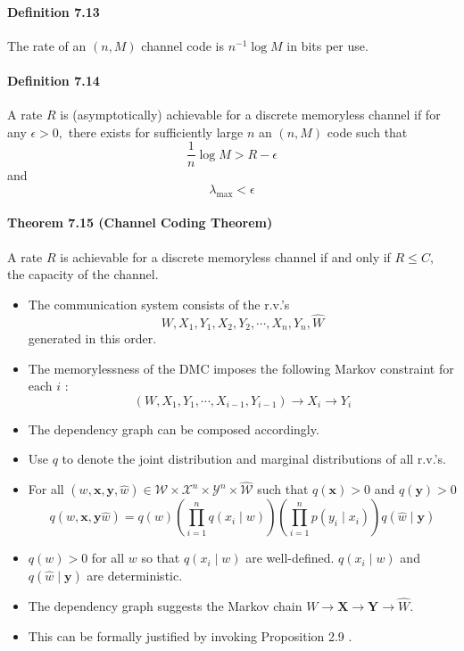 \documentclass[8pt]{article}
\begin{document}
\paragraph{Definition 7.13} The rate of an $(n, M)$ channel code is $n^{-1} \log M$ in bits per
use.

\paragraph{Definition 7.14} A rate $R$ is (asymptotically) achievable for a discrete memoryless channel if for any $\epsilon>0,$ there exists for sufficiently large $n$ an $(n, M)$ code such that
$$
\frac{1}{n} \log M>R-\epsilon
$$
and
$$
\lambda_{\max }<\epsilon
$$
\paragraph{Theorem 7.15 (Channel Coding Theorem)} A rate $R$ is achievable for a discrete memoryless channel if and only if $R \leq C,$ the capacity of the channel.

\begin{itemize}
	\item The communication system consists of the r.v.'s
	$$
	W, X_{1}, Y_{1}, X_{2}, Y_{2}, \cdots, X_{n}, Y_{n}, \hat{W}
	$$
	generated in this order.
	\item The memorylessness of the DMC imposes the following Markov constraint for each $i$ :
	$$
	\left(W, X_{1}, Y_{1}, \cdots, X_{i-1}, Y_{i-1}\right) \rightarrow X_{i} \rightarrow Y_{i}
	$$
	\item The dependency graph can be composed accordingly.
	\item Use $q$ to denote the joint distribution and marginal distributions of all
	r.v.'s.
	\item For all $(w, \mathbf{x}, \mathbf{y}, \hat{w}) \in \mathcal{W} \times \mathcal{X}^{n} \times \mathcal{Y}^{n} \times \hat{\mathcal{W}}$ such that $q(\mathbf{x})>0$ and $q(\mathbf{y})>0$
	$$
	q(w, \mathbf{x}, \mathbf{y} \hat{w})=q(w)\left(\prod_{i=1}^{n} q\left(x_{i} \mid w\right)\right)\left(\prod_{i=1}^{n} p\left(y_{i} \mid x_{i}\right)\right) q(\hat{w} \mid \mathbf{y})
	$$
	\item $q(w)>0$ for all $w$ so that $q\left(x_{i} \mid w\right)$ are well-defined.
	$q\left(x_{i} \mid w\right)$ and $q(\hat{w} \mid \mathbf{y})$ are deterministic.
	\item The dependency graph suggests the Markov chain $W \rightarrow \mathbf{X} \rightarrow \mathbf{Y} \rightarrow \hat{W}$.
	\item This can be formally justified by invoking Proposition 2.9 .
\end{itemize}
\end{document}
